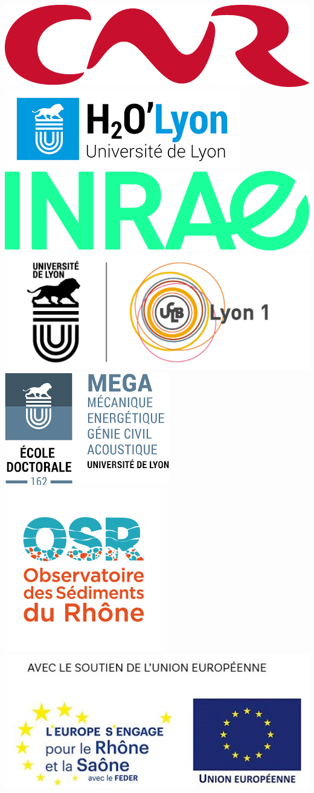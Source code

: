 {

\begin{frame}[plain]
     \vspace{10pt}
     \includegraphics[height= .5cm]{./Figures/CNR.png}	\hspace{4pt}
     \includegraphics[height= .6cm]{./Figures/h2o.png}  \hspace{4pt}
     \includegraphics[height= .5cm]{./Figures/INRAE.jpg}  \hspace{4pt}
     \includegraphics[height= .6cm]{./Figures/lyon1.png}  \hspace{4pt}
     \includegraphics[height= .6cm]{./Figures/MEGA.png}  \hspace{4pt} 
     \includegraphics[height= .6cm]{./Figures/OSR.jpg}  \hspace{4pt}
     \includegraphics[height= .6cm]{./Figures/Eu.jpg}  

\end{frame}}
